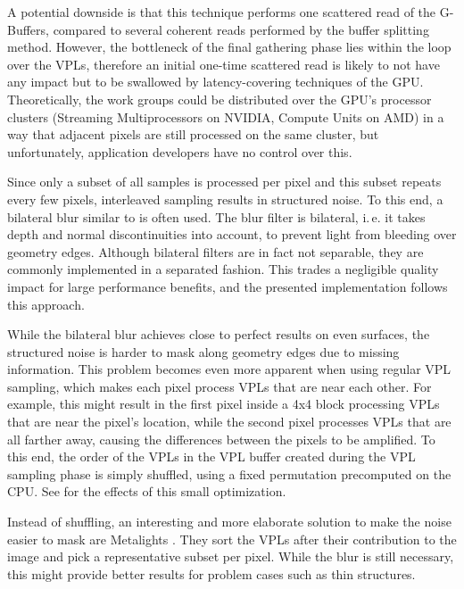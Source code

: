 A potential downside is that this technique performs one scattered read of the G-Buffers, compared to several coherent reads performed by the buffer splitting method. However, the bottleneck of the final gathering phase lies within the loop over the VPLs, therefore an initial one-time scattered read is likely to not have any impact but to be swallowed by latency-covering techniques of the GPU. Theoretically, the work groups could be distributed over the GPU's processor clusters (Streaming Multiprocessors on NVIDIA, Compute Units on AMD) in a way that adjacent pixels are still processed on the same cluster, but unfortunately, application developers have no control over this.

Since only a subset of all samples is processed per pixel and this subset repeats every few pixels, interleaved sampling results in structured noise. To this end, a bilateral blur similar to \citet{laine2007incremental} is often used. The blur filter is bilateral, i.\,e. it takes depth and normal discontinuities into account, to prevent light from bleeding over geometry edges. Although bilateral filters are in fact not separable, they are commonly implemented in a separated fashion. This trades a negligible quality impact for large performance benefits, and the presented implementation follows this approach.


While the bilateral blur achieves close to perfect results on even surfaces, the structured noise is harder to mask along geometry edges due to missing information. This problem becomes even more apparent when using regular VPL sampling, which makes each pixel process VPLs that are near each other. For example, this might result in the first pixel inside a 4x4 block processing VPLs that are near the pixel's location, while the second pixel processes VPLs that are all farther away, causing the differences between the pixels to be amplified. To this end, the order of the VPLs in the VPL buffer created during the VPL sampling phase is simply shuffled, using a fixed permutation precomputed on the CPU. See  for the effects of this small optimization.

Instead of shuffling, an interesting and more elaborate solution to make the noise easier to mask are Metalights \citep{Faure:2010:Metalights}. They sort the VPLs after their contribution to the image and pick a representative subset per pixel. While the blur is still necessary, this might provide better results for problem cases such as thin structures.


